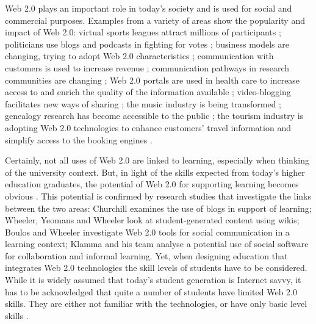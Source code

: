 Web 2.0 plays an important role in today's society and is used for social and
commercial purposes. Examples from a variety of areas show the popularity and
impact of Web 2.0: virtual sports leagues attract millions of participants
\citep{Holahan2006}; politicians use blogs and podcasts in fighting for
votes \citep{Capell2006}; business models are changing, trying to adopt Web 2.0
characteristics \citep{Wirtz2010}; communication with customers is used to
increase revenue \citep{Havenstein2007}; communication pathways in research
communities are changing \citep{Ashling2007}; Web 2.0 portals are used in health
care to increase access to and enrich the quality of the information available
\citep{Gorlitz2010,Metzger2011}; video-blogging facilitates new ways of sharing
\citep{LibraryTechnologyReports2007}; the music industry is being transformed
\citep{Holahan2007}; genealogy research has become accessible to the public
\citep{MacMillan2007}; the tourism industry is adopting Web 2.0 technologies to
enhance customers' travel information and simplify access to the booking engines
\citep{Leung2011}.

Certainly, not all uses of Web 2.0 are linked to learning, especially when
thinking of the university context. But, in light of the \LLLs skills expected
from today's higher education graduates, the potential of Web 2.0 for supporting
learning becomes obvious \citep{Tian2011}. This potential is confirmed by
research studies that investigate the links between the two areas: Churchill
\citeyearpar{Churchill2009} examines the use of blogs in support of learning;
Wheeler, Yeomans and Wheeler \citeyearpar{Wheeler2008} look at student-generated
content using wikis; Boulos and Wheeler \citeyearpar{Boulos2007} investigate Web
2.0 tools for social communication in a learning context; Klamma and his team
\citeyearpar{Klamma2007} analyse a potential use of social software for
collaboration and informal learning. Yet, when designing education that
integrates Web 2.0 technologies the skill levels of students have to be
considered. While it is widely assumed that today's student generation is
Internet savvy, it has to be acknowledged that quite a number of students have
limited Web 2.0 skills. They are either not familiar with the technologies, or
have only basic level skills \citep{Kennedy2008}.

